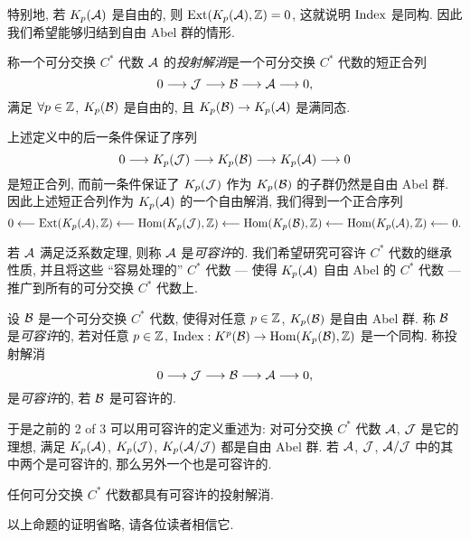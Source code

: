特别地, 若 $ K_p(\mathcal{A}) $ 是自由的, 则 $ \mathrm{Ext}(K_p(\mathcal{A}),\mathbb{Z})=0 $, 这就说明 $ \mathrm{Index} $ 是同构. 因此我们希望能够归结到自由 Abel 群的情形.

\begin{Definition}[投射解消]
	称一个可分交换 $ C^* $ 代数 $ \mathcal{A} $ 的\emph{投射解消}是一个可分交换 $ C^* $ 代数的短正合列
	\[
		0\longrightarrow\mathcal{J}\longrightarrow\mathcal{B}\longrightarrow\mathcal{A}\longrightarrow 0,
	\]
	满足 $ \forall p\in\mathbb{Z} $, $ K_p(\mathcal{B}) $ 是自由的, 且 $ K_p(\mathcal{B})\to K_p(\mathcal{A}) $ 是满同态.
\end{Definition}

上述定义中的后一条件保证了序列
\[
	0\longrightarrow K_p(\mathcal{J})\longrightarrow K_p(\mathcal{B})\longrightarrow K_p(\mathcal{A})\longrightarrow 0
\]
是短正合列, 而前一条件保证了 $ K_p(\mathcal{J}) $ 作为 $ K_p(\mathcal{B}) $ 的子群仍然是自由 Abel 群. 因此上述短正合列作为 $ K_p(\mathcal{A}) $ 的一个自由解消, 我们得到一个正合序列
\[
	0\longleftarrow\mathrm{Ext}(K_p(\mathcal{A}),\mathbb{Z})\longleftarrow\mathrm{Hom}(K_p(\mathcal{J}),\mathbb{Z})\longleftarrow\mathrm{Hom}(K_p(\mathcal{B}),\mathbb{Z})\longleftarrow\mathrm{Hom}(K_p(\mathcal{A}),\mathbb{Z})\longleftarrow 0.
\]

若 $ \mathcal{A} $ 满足泛系数定理, 则称 $ \mathcal{A} $ 是\emph{可容许}的. 我们希望研究可容许 $ C^* $ 代数的继承性质, 并且将这些 ``容易处理的'' $ C^* $ 代数 --- 使得 $ K_p(\mathcal{A}) $ 自由 Abel 的 $ C^* $ 代数 --- 推广到所有的可分交换 $ C^* $ 代数上.

\begin{Definition}[可容许]
	设 $ \mathcal{B} $ 是一个可分交换 $ C^* $ 代数, 使得对任意 $ p\in\mathbb{Z} $, $ K_p(\mathcal{B}) $ 是自由 Abel 群. 称 $ \mathcal{B} $ 是\emph{可容许}的, 若对任意 $ p\in\mathbb{Z} $, $ \mathrm{Index} : K^p(\mathcal{B})\to\mathrm{Hom}(K_p(\mathcal{B}),\mathbb{Z}) $ 是一个同构. 称投射解消
	\[
		0\longrightarrow\mathcal{J}\longrightarrow\mathcal{B}\longrightarrow\mathcal{A}\longrightarrow 0,
	\]
	是\emph{可容许}的, 若 $ \mathcal{B} $ 是可容许的.
\end{Definition}

于是之前的 2 of 3 可以用可容许的定义重述为: 对可分交换 $ C^* $ 代数 $ \mathcal{A} $, $ \mathcal{J} $ 是它的理想, 满足 $ K_p(\mathcal{A}) $, $ K_p(\mathcal{J}) $, $ K_p(\mathcal{A}/\mathcal{J}) $ 都是自由 Abel 群. 若 $ \mathcal{A} $, $ \mathcal{J} $, $ \mathcal{A}/\mathcal{J} $ 中的其中两个是可容许的, 那么另外一个也是可容许的.

\begin{Proposition}
	任何可分交换 $ C^* $ 代数都具有可容许的投射解消.
\end{Proposition}

以上命题的证明省略, 请各位读者相信它.

